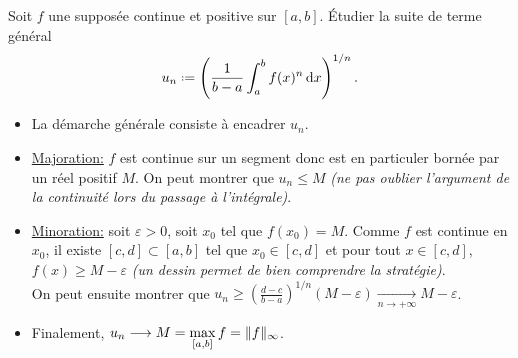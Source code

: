  \begin{exercice}
    Soit $f$ une supposée continue et positive sur $[a, b]$. Étudier la suite de terme général 
    $$u_n \defeq \left( \frac{1}{b-a} \int_{a}^{b} f(x)^n \d x \right)^{1/n}.$$
 \end{exercice}

\begin{elem_sol}
    \begin{itemize}
        \item La démarche générale consiste à encadrer $u_n$. 
        \item \underline{Majoration:} $f$ est continue sur un segment donc est en particuler bornée par un réel positif $M$. On peut montrer que $u_n \leqslant M$ \emph{(ne pas oublier l'argument de la continuité lors du passage à l'intégrale)}.
        \item \underline{Minoration:} soit $\varepsilon > 0$, soit $x_0$ tel que $f(x_0) = M$. Comme $f$ est continue en $x_0$, il existe $[c, d] \subset [a, b]$ tel que $x_0 \in [c, d]$ et pour tout $x \in [c, d]$, $f(x) \geqslant M - \varepsilon$ \emph{(un dessin permet de bien comprendre la stratégie)}.\\
        On peut ensuite montrer que $u_n \geqslant \left(\frac{d-c}{b-a} \right)^{1/n}(M-\varepsilon) \xrightarrow[n \to + \infty]{} M-\varepsilon$.
        \item Finalement, $u_n \displaystyle \longrightarrow M = \max_{[ a, b ]} f = \Vert f \Vert_\infty$.
    \end{itemize}
\end{elem_sol}
